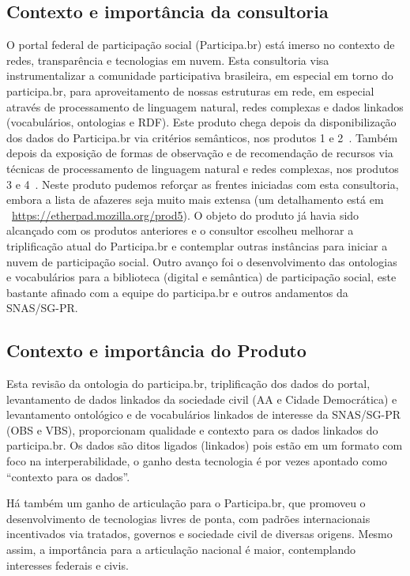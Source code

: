 \documentclass[12pt]{article}
\begin{document}
\subsection{Contexto e importância da consultoria}
O portal federal de participação social (Participa.br) está imerso no contexto de redes, transparência e tecnologias em nuvem. Esta consultoria visa instrumentalizar a comunidade participativa brasileira, em especial em torno do participa.br, para aproveitamento de nossas estruturas em rede, em especial através de processamento de linguagem natural, redes complexas e dados linkados (vocabulários, ontologias e RDF). Este produto chega depois da disponibilização dos dados do Participa.br via critérios semânticos, nos produtos 1 e 2~\cite{repoProd1,repoProd2}. Também depois da exposição de formas de observação e de recomendação de recursos via técnicas de processamento de linguagem natural e redes complexas, nos produtos 3 e 4~\cite{repoProd3,repoProd4}. Neste produto pudemos reforçar as frentes iniciadas com esta consultoria, embora a lista de afazeres seja muito mais extensa (um detalhamento está em ~\url{https://etherpad.mozilla.org/prod5}). O objeto do produto já havia sido alcançado com os produtos anteriores e o consultor escolheu melhorar a triplificação atual do Participa.br e contemplar outras instâncias para iniciar a nuvem de participação social. Outro avanço foi o desenvolvimento das ontologias e vocabulários para a biblioteca (digital e semântica) de participação social, este bastante afinado com a equipe do participa.br e outros andamentos da SNAS/SG-PR.

\subsection{Contexto e importância do Produto}
Esta revisão da ontologia do participa.br, triplificação dos dados do portal, levantamento de dados linkados da sociedade civil (AA e Cidade Democrática) e levantamento ontológico e de vocabulários linkados de interesse da SNAS/SG-PR (OBS e VBS), proporcionam qualidade e contexto para os dados linkados do participa.br. Os dados são ditos ligados (linkados) pois estão em um formato com foco na interperabilidade, o ganho desta tecnologia é por vezes apontado como ``contexto para os dados''.

Há também um ganho de articulação para o Participa.br, que promoveu o desenvolvimento de tecnologias livres de ponta, com padrões internacionais incentivados via tratados, governos e sociedade civil de diversas origens. Mesmo assim, a importância para a articulação nacional é maior, contemplando interesses federais e civis.
\end{document}
